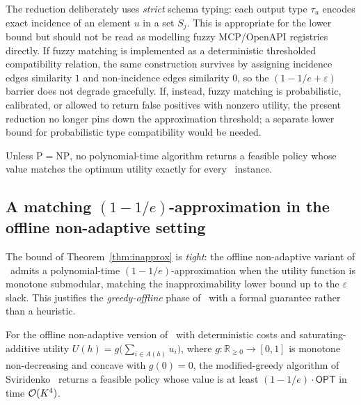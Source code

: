 \begin{remark}
\label{rem:fuzzy-schema-lower-bound}
The reduction deliberately uses \emph{strict} schema typing: each
output type $\tau_u$ encodes exact incidence of an element $u$ in a
set $S_j$. This is appropriate for the lower bound but should not be
read as modelling fuzzy MCP/OpenAPI registries directly. If fuzzy
matching is implemented as a deterministic thresholded compatibility
relation, the same construction survives by assigning incidence edges
similarity $1$ and non-incidence edges similarity $0$, so the
$(1-1/e+\varepsilon)$ barrier does not degrade gracefully. If,
instead, fuzzy matching is probabilistic, calibrated, or allowed to
return false positives with nonzero utility, the present reduction no
longer pins down the approximation threshold; a separate lower bound
for probabilistic type compatibility would be needed.
\end{remark}

\begin{corollary}
\label{cor:inap-trivial}
Unless $\mathrm{P} = \mathrm{NP}$, no polynomial-time algorithm returns
a feasible policy whose value matches the optimum utility exactly for
every \CBSLAO~instance.
\end{corollary}

\subsection{A matching $(1-1/e)$-approximation in the offline non-adaptive setting}
\label{sec:approx}

The bound of Theorem~\ref{thm:inapprox} is \emph{tight}: the offline
non-adaptive variant of \CBSLAO~admits a polynomial-time
$(1-1/e)$-approximation when the utility function is monotone
submodular, matching the inapproximability lower bound up to the
$\varepsilon$ slack. This justifies the \emph{greedy-offline} phase of
\CBUC~with a formal guarantee rather than a heuristic.

\begin{theorem}
\label{thm:approx}
For the offline non-adaptive version of \CBSLAO~with deterministic
costs and saturating-additive utility
$U(h) = g\!\bigl(\sum_{i \in A(h)} u_i\bigr)$, where
$g: \mathbb{R}_{\ge 0} \to [0, 1]$ is monotone non-decreasing and
concave with $g(0) = 0$, the modified-greedy algorithm of
Sviridenko~\cite{sviridenko2004} returns a feasible policy whose value
is at least $(1 - 1/e) \cdot \mathsf{OPT}$ in time $\mathcal{O}(K^4)$.
\end{theorem}

